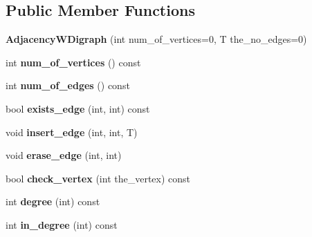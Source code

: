 \subsection*{Public Member Functions}
\begin{DoxyCompactItemize}
\item 
\mbox{\label{classAdjacencyWDigraph_aba0b8944172c501a75e4ceb4ce6de298}} 
{\bfseries Adjacency\+W\+Digraph} (int num\+\_\+of\+\_\+vertices=0, T the\+\_\+no\+\_\+edges=0)
\item 
\mbox{\label{classAdjacencyWDigraph_ac5fe40a92fd523e38556074638ebb0d9}} 
int {\bfseries num\+\_\+of\+\_\+vertices} () const
\item 
\mbox{\label{classAdjacencyWDigraph_a1f7c91568a37048136fbeaa745198342}} 
int {\bfseries num\+\_\+of\+\_\+edges} () const
\item 
\mbox{\label{classAdjacencyWDigraph_a2798e841423506f8c269758a945f33ca}} 
bool {\bfseries exists\+\_\+edge} (int, int) const
\item 
\mbox{\label{classAdjacencyWDigraph_a1f1f40e28e3560a9acef4a570c805d2e}} 
void {\bfseries insert\+\_\+edge} (int, int, T)
\item 
\mbox{\label{classAdjacencyWDigraph_a35b3e083122c98bd9095a4ec2fab569d}} 
void {\bfseries erase\+\_\+edge} (int, int)
\item 
\mbox{\label{classAdjacencyWDigraph_a1765659ef5b2a3ba21f1427070a2047c}} 
bool {\bfseries check\+\_\+vertex} (int the\+\_\+vertex) const
\item 
\mbox{\label{classAdjacencyWDigraph_ac6fc7649a511cba682a0a5ea9dbd8850}} 
int {\bfseries degree} (int) const
\item 
\mbox{\label{classAdjacencyWDigraph_ab61bb7a2fe0c23439f70d25f93b3943b}} 
int {\bfseries in\+\_\+degree} (int) const
\item 
\mbox{\label{classAdjacencyWDigraph_ab33938596c7dfeec5830dd9e3ea33ce1}} 

\end{DoxyCompactItemize}
